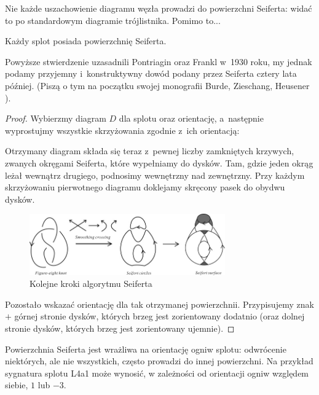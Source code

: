Nie każde uszachowienie diagramu węzła prowadzi do powierzchni Seiferta: widać to po standardowym diagramie trójlistnika.
Pomimo to...

\begin{proposition}
\label{prp:seifert_exists}%
    Każdy splot posiada powierzchnię Seiferta.
\end{proposition}

Powyższe stwierdzenie uzasadnili Pontriagin oraz Frankl w~1930 roku, my jednak podamy przyjemny i~konstruktywny dowód podany przez Seiferta \cite{seifert1935} cztery lata później.
%
(Piszą o tym na początku swojej monografii Burde, Zieschang, Heusener \cite[s. 19]{zieschang2014}).

\begin{proof}
%
    Wybierzmy diagram $D$ dla splotu oraz orientację,
    a~następnie wyprostujmy wszystkie skrzyżowania zgodnie z~ich orientacją:

    Otrzymany diagram składa się teraz z~pewnej liczby zamkniętych krzywych,
    zwanych okręgami Seiferta, które wypełniamy do dysków.
    Tam, gdzie jeden okrąg leżał wewnątrz drugiego, podnosimy wewnętrzny nad zewnętrzny.
    Przy każdym skrzyżowaniu pierwotnego diagramu doklejamy skręcony pasek do obydwu dysków.

    \begin{figure}[H]
        \centering
        \includegraphics[width=0.75\textwidth]{../data/seifert-algorithm.jpg}
        \caption[Smthing]{Kolejne kroki algorytmu Seiferta}
    \end{figure}

    Pozostało wskazać orientację dla tak otrzymanej powierzchnii.
    Przypisujemy znak $+$ górnej stronie dysków, których brzeg jest zorientowany dodatnio (oraz dolnej stronie dysków, których brzeg jest zorientowany ujemnie).
%
\end{proof}

Powierzchnia Seiferta jest wrażliwa na orientację ogniw splotu: odwrócenie niektórych, ale nie wszystkich, często prowadzi do innej powierzchni.
Na przykład sygnatura splotu L4a1 może wynosić, w zależności od orientacji ogniw względem siebie, $1$ lub $-3$.

%


